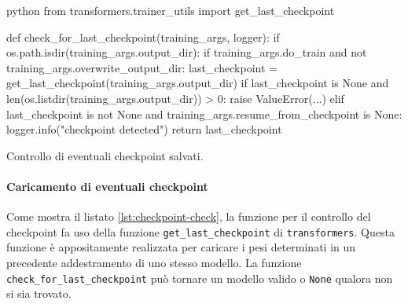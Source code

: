 \documentclass[12pt,a4paper,twoside,openright]{book}
\begin{document}
\begin{customcode}
\begin{mintedbox}{python}
from transformers.trainer_utils import get_last_checkpoint

def check_for_last_checkpoint(training_args, logger):
    if os.path.isdir(training_args.output_dir):
        if training_args.do_train and not training_args.overwrite_output_dir:
            last_checkpoint = get_last_checkpoint(training_args.output_dir)
            if last_checkpoint is None and len(os.listdir(training_args.output_dir)) > 0:
                raise ValueError(...)
            elif last_checkpoint is not None and training_args.resume_from_checkpoint is None:
                logger.info("checkpoint detected")
            return last_checkpoint
\end{mintedbox}
\caption{Controllo di eventuali checkpoint salvati.}
\label{lst:checkpoint-check}
\end{customcode}

\paragraph{Caricamento di eventuali checkpoint}
Come mostra il listato \ref{lst:checkpoint-check}, la funzione per il controllo del checkpoint fa uso della funzione \texttt{get\_last\_checkpoint} di \texttt{transformers}. Questa funzione è appositamente realizzata per caricare i pesi determinati in un precedente addestramento di uno stesso modello. La funzione \texttt{check\_for\_last\_checkpoint} può tornare un modello valido o \texttt{None} qualora non si sia trovato. 
\end{document}
